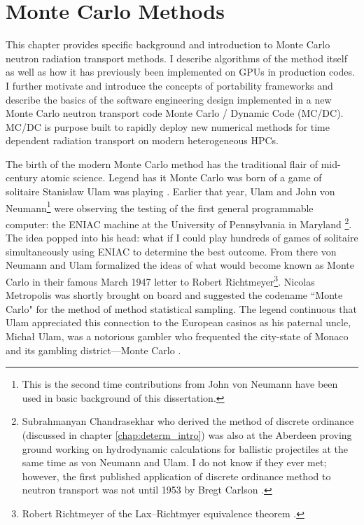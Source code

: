 \chapter{Monte Carlo Methods}


\label{chap:mc_methods_intro}


This chapter provides specific background and introduction to Monte Carlo neutron radiation transport methods.
I describe algorithms of the method itself as well as how it has previously been implemented on GPUs in production codes.
I further motivate and introduce the concepts of portability frameworks and describe the basics of the software engineering design implemented in a new Monte Carlo neutron transport code Monte Carlo / Dynamic Code (MC/DC).
MC/DC is purpose built to rapidly deploy new numerical methods for time dependent radiation transport on modern heterogeneous HPCs.

The birth of the modern Monte Carlo method has the traditional flair of mid-century atomic science.
Legend has it Monte Carlo was born of a game of solitaire Stanisław Ulam was playing \cite{metropolis_1987_history}.
Earlier that year, Ulam and John von Neumann\footnote{This is the second time contributions from John von Neumann have been used in basic background of this dissertation.}
were observing the testing of the first general programmable computer: the ENIAC machine at the University of Pennsylvania in Maryland \cite{anderson_1986_maniac}\footnote{Subrahmanyan Chandrasekhar who derived the method of discrete ordinance (discussed in chapter \ref{chap:determ_intro}) was also at the Aberdeen proving ground working on hydrodynamic calculations for ballistic projectiles at the same time as von Neumann and Ulam. I do not know if they ever met; however, the first published application of discrete ordinance method to neutron transport was not until 1953 by Bregt Carlson \cite{carlson_1955_sn, carlson_1958_sn}.
}.
The idea popped into his head: what if I could play hundreds of games of solitaire simultaneously using ENIAC to determine the best outcome.
From there von Neumann and Ulam formalized the ideas of what would become known as Monte Carlo in their famous March 1947 letter to Robert Richtmeyer\footnote{
Robert Richtmeyer of the Lax–Richtmyer equivalence theorem \cite{Lax_1956_stability}.
}.
Nicolas Metropolis was shortly brought on board and suggested the codename ``Monte Carlo" for the method of method statistical sampling.
The legend continuous that Ulam appreciated this connection to the European casinos as his paternal uncle, Michał Ulam, was a notorious gambler who frequented the city-state of Monaco and its gambling district---Monte Carlo \cite{anderson_1986_maniac}.

